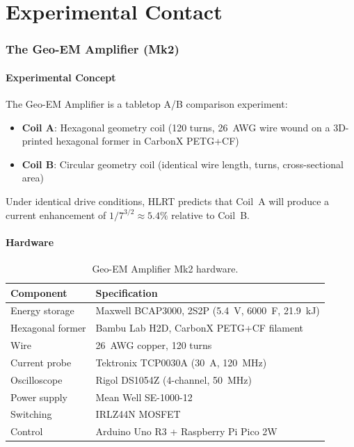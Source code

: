 \documentclass[11pt,letterpaper]{article}
\begin{document}
%
%
\newpage
\part{Experimental Contact}

\section{The Geo-EM Amplifier (Mk2)}

\subsection{Experimental Concept}

The Geo-EM Amplifier is a tabletop A/B comparison experiment:
\begin{itemize}[nosep]
  \item \textbf{Coil A}: Hexagonal geometry coil (120 turns, 26~AWG wire
        wound on a 3D-printed hexagonal former in CarbonX PETG+CF)
  \item \textbf{Coil B}: Circular geometry coil (identical wire length,
        turns, cross-sectional area)
\end{itemize}
Under identical drive conditions, HLRT predicts that Coil~A will produce
a current enhancement of $1/7^{3/2}\approx5.4\%$ relative to Coil~B.

\subsection{Hardware}

\begin{table}[h]
\centering
\begin{tabular}{ll}
\toprule
\textbf{Component} & \textbf{Specification} \\
\midrule
Energy storage    & Maxwell BCAP3000, 2S2P (5.4~V, 6000~F, 21.9~kJ) \\
Hexagonal former  & Bambu Lab H2D, CarbonX PETG+CF filament \\
Wire              & 26~AWG copper, 120 turns \\
Current probe     & Tektronix TCP0030A (30~A, 120~MHz) \\
Oscilloscope      & Rigol DS1054Z (4-channel, 50~MHz) \\
Power supply      & Mean Well SE-1000-12 \\
Switching         & IRLZ44N MOSFET \\
Control           & Arduino Uno R3 + Raspberry Pi Pico 2W \\
\bottomrule
\end{tabular}
\caption{Geo-EM Amplifier Mk2 hardware.}
\end{table}
\end{document}
